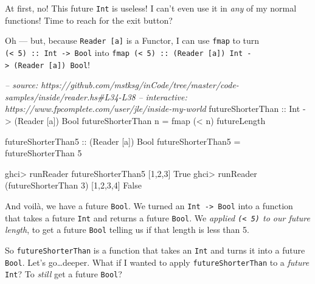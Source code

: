 \documentclass[]{article}
\newenvironment{Shaded}{}{}
\newcommand{\DataTypeTok}[1]{\textcolor[rgb]{0.56,0.13,0.00}{#1}}
\newcommand{\DecValTok}[1]{\textcolor[rgb]{0.25,0.63,0.44}{#1}}
\newcommand{\CommentTok}[1]{\textcolor[rgb]{0.38,0.63,0.69}{\textit{#1}}}
\newcommand{\OtherTok}[1]{\textcolor[rgb]{0.00,0.44,0.13}{#1}}
\newcommand{\FunctionTok}[1]{\textcolor[rgb]{0.02,0.16,0.49}{#1}}
\newcommand{\NormalTok}[1]{#1}
\begin{document}
At first, no! This future \texttt{Int} is useless! I can't even use it in
\emph{any} of my normal functions! Time to reach for the exit button?

Oh --- but, because \texttt{Reader\ {[}a{]}} is a Functor, I can use
\texttt{fmap} to turn \texttt{(\textless{}\ 5)\ ::\ Int\ -\textgreater{}\ Bool}
into
\texttt{fmap\ (\textless{}\ 5)\ ::\ (Reader\ {[}a{]})\ Int\ -\textgreater{}\ (Reader\ {[}a{]})\ Bool}!

\begin{Shaded}
\begin{Highlighting}[]
\CommentTok{-- source: https://github.com/mstksg/inCode/tree/master/code-samples/inside/reader.hs#L34-L38}
\CommentTok{-- interactive: https://www.fpcomplete.com/user/jle/inside-my-world}
\OtherTok{futureShorterThan ::} \DataTypeTok{Int} \OtherTok{->}\NormalTok{ (}\DataTypeTok{Reader}\NormalTok{ [a]) }\DataTypeTok{Bool}
\NormalTok{futureShorterThan n }\FunctionTok{=}\NormalTok{ fmap (}\FunctionTok{<}\NormalTok{ n) futureLength}

\OtherTok{futureShorterThan5 ::}\NormalTok{ (}\DataTypeTok{Reader}\NormalTok{ [a]) }\DataTypeTok{Bool}
\NormalTok{futureShorterThan5 }\FunctionTok{=}\NormalTok{ futureShorterThan }\DecValTok{5}
\end{Highlighting}
\end{Shaded}

\begin{Shaded}
\begin{Highlighting}[]
\NormalTok{ghci}\FunctionTok{>}\NormalTok{ runReader futureShorterThan5 [}\DecValTok{1}\NormalTok{,}\DecValTok{2}\NormalTok{,}\DecValTok{3}\NormalTok{]}
\DataTypeTok{True}
\NormalTok{ghci}\FunctionTok{>}\NormalTok{ runReader (futureShorterThan }\DecValTok{3}\NormalTok{) [}\DecValTok{1}\NormalTok{,}\DecValTok{2}\NormalTok{,}\DecValTok{3}\NormalTok{,}\DecValTok{4}\NormalTok{]}
\DataTypeTok{False}
\end{Highlighting}
\end{Shaded}

And voilà, we have a future \texttt{Bool}. We turned an
\texttt{Int\ -\textgreater{}\ Bool} into a function that takes a future
\texttt{Int} and returns a future \texttt{Bool}. We \emph{applied
\texttt{(\textless{}\ 5)} to our future length}, to get a future \texttt{Bool}
telling us if that length is less than 5.

So \texttt{futureShorterThan} is a function that takes an \texttt{Int} and turns
it into a future \texttt{Bool}. Let's go\ldots{}deeper. What if I wanted to
apply \texttt{futureShorterThan} to a \emph{future} \texttt{Int}? To
\emph{still} get a future \texttt{Bool}?
\end{document}
